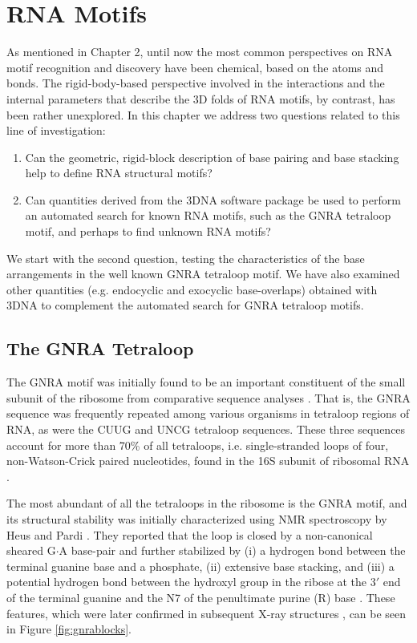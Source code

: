 \chapter{RNA Motifs}
\label{motifs} 

As mentioned  in Chapter 2, until  now the most  common perspectives on
RNA motif recognition  and discovery have been chemical,  based on the
atoms  and bonds.  The  rigid-body-based  perspective involved  in the
interactions and the internal parameters that describe the 3D folds of
RNA motifs, by contrast, has  been rather unexplored.  In this chapter
we address two questions related to this line of investigation:

\begin{enumerate}
\item{Can the  geometric, rigid-block description of  base pairing and
  base stacking help to define RNA structural motifs?}
\item{Can quantities derived from the 3DNA software package be used to
  perform an automated search for  known RNA motifs, such as the GNRA
  tetraloop motif, and perhaps to find unknown RNA motifs?}
\end{enumerate}

We start with the second  question, testing the characteristics of the
base arrangements  in the  well known GNRA  tetraloop motif.   We have
also  examined  other   quantities  (e.g.   endocyclic  and  exocyclic
base-overlaps) obtained with 3DNA \cite{lu2003, lu2008b} to complement
the automated search for GNRA tetraloop motifs.

\section{The GNRA Tetraloop}
The GNRA motif  was initially found to be  an important constituent of
the small  subunit of the ribosome from  comparative sequence analyses
\cite{woese1990}. That  is, the GNRA sequence  was frequently repeated
among various organisms in tetraloop  regions of RNA, as were the CUUG
and UNCG  tetraloop sequences. These three sequences  account for more
than  70\% of  all tetraloops,  i.e.  single-stranded  loops  of four,
non-Watson-Crick  paired  nucleotides, found  in  the  16S subunit  of
ribosomal RNA \cite{woese1990, depaul2010}.

The most  abundant of all the  tetraloops in the ribosome  is the GNRA
motif, and its structural  stability was initially characterized using
NMR  spectroscopy by  Heus and  Pardi \cite{heus1991}.   They reported
that the loop is closed by a non-canonical sheared G$\cdot$A base-pair
and further  stabilized by  (i) a hydrogen  bond between  the terminal
guanine base and a phosphate,  (ii) extensive base stacking, and (iii)
a potential hydrogen bond between  the hydroxyl group in the ribose at
the 3$'$  end of the  terminal guanine and  the N7 of  the penultimate
purine  (R) base  \cite{heus1991}.  These  features, which  were later
confirmed in subsequent X-ray structures \cite{pley1994b}, can be seen
in Figure \ref{fig:gnrablocks}.

